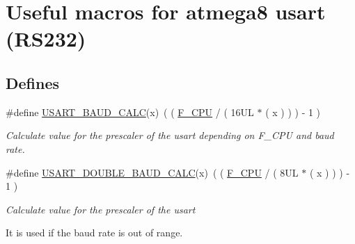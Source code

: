 \hypertarget{group___u_s_a_r_t___m_a_c_r_o_s}{\section{\-Useful macros for atmega8 usart (\-R\-S232)}
\label{group___u_s_a_r_t___m_a_c_r_o_s}
}
\subsection*{\-Defines}
\begin{DoxyCompactItemize}
\item 
\hypertarget{group___u_s_a_r_t___m_a_c_r_o_s_ga0fbb2397eec70ece300296c0f9a4c316}{\#define \hyperlink{group___u_s_a_r_t___m_a_c_r_o_s_ga0fbb2397eec70ece300296c0f9a4c316}{\-U\-S\-A\-R\-T\-\_\-\-B\-A\-U\-D\-\_\-\-C\-A\-L\-C}(x)~( ( \hyperlink{group___a_t_m_e_g_a___s_e_t_t_i_n_g_s_ga43bafb28b29491ec7f871319b5a3b2f8}{\-F\-\_\-\-C\-P\-U} / ( 16\-U\-L $\ast$ ( x ) ) ) -\/ 1 )}\label{group___u_s_a_r_t___m_a_c_r_o_s_ga0fbb2397eec70ece300296c0f9a4c316}

\begin{DoxyCompactList}\small\item\em \-Calculate value for the prescaler of the usart depending on \-F\-\_\-\-C\-P\-U and baud rate. \end{DoxyCompactList}\item 
\hypertarget{group___u_s_a_r_t___m_a_c_r_o_s_gaa9d9d95f01f9c72166262ecfa9eb4bef}{\#define \hyperlink{group___u_s_a_r_t___m_a_c_r_o_s_gaa9d9d95f01f9c72166262ecfa9eb4bef}{\-U\-S\-A\-R\-T\-\_\-\-D\-O\-U\-B\-L\-E\-\_\-\-B\-A\-U\-D\-\_\-\-C\-A\-L\-C}(x)~( ( \hyperlink{group___a_t_m_e_g_a___s_e_t_t_i_n_g_s_ga43bafb28b29491ec7f871319b5a3b2f8}{\-F\-\_\-\-C\-P\-U} / ( 8\-U\-L $\ast$ ( x ) ) ) -\/ 1 )}\label{group___u_s_a_r_t___m_a_c_r_o_s_gaa9d9d95f01f9c72166262ecfa9eb4bef}

\begin{DoxyCompactList}\small\item\em \-Calculate value for the prescaler of the usart\par
 \-It is used if the baud rate is out of range. \end{DoxyCompactList}\end{DoxyCompactItemize}
